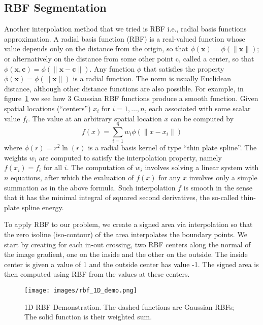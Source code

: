 \subsection{RBF Segmentation}\label{subsec:rbfSeg}
Another interpolation method that we tried is RBF i.e., radial basis functions approximation.
A radial basis function (RBF) is a real-valued function whose value depends only on the distance from the origin, so that $\phi(\mathbf{x}) = \phi(\|\mathbf{x}\|)$; or alternatively on the distance from some other point c, called a center, so that $\phi(\mathbf{x}, \mathbf{c}) = \phi(\|\mathbf{x}-\mathbf{c}\|)$. Any function $\phi$ that satisfies the property $\phi(\mathbf{x}) = \phi(\|\mathbf{x}\|)$ is a radial function. The norm is usually Euclidean distance, although other distance functions are also possible.
For example, in figure~\ref{fig:rbfDemo} we see how 3 Gaussian RBF functions produce a smooth function.
Given spatial locations (``centers'') $x_i$ for $i=1,\ldots,n$, each associated with some scalar value $f_i$. The value at an arbitrary spatial location $x$ can be computed by
\[
f(x) = \sum_{i=1}^{n} w_i \phi (\|x - x_i\|)
\]
where $\phi (r)  = r^{2}  \ln (r)$ is a radial basis kernel of type ``thin plate spline''. The weights $w_i$ are computed to satisfy the interpolation property, namely $f(x_i)=f_i$ for all $i$. The computation of $w_i$ involves solving a linear system with $n$ equations, after which the evaluation of $f(x)$ for any $x$ involves only a simple summation as in the above formula. Such interpolation $f$ is smooth in the sense that it has the minimal integral of squared second derivatives, the so-called thin-plate spline energy.

To apply RBF to our problem, we create a signed area via interpolation so that the zero isoline (iso-contour) of the area interpolates the boundary points. We start by creating for each in-out crossing, two RBF centers along the normal of the image gradient, one on the inside and the other on the outside. The inside center is given a value of 1 and the outside center has value -1. The signed area is then computed using RBF from the values at these centers.

\begin{figure}[htb]
	\centering
		\texttt{[image: images/rbf\_1D\_demo.png]}
			\caption[1D RBF Demonstration]{
				1D RBF Demonstration.
				The dashed functions are Gaussian RBFs;
				The solid function is their weighted sum.
		}\label{fig:rbfDemo}
\end{figure}

